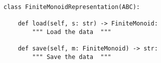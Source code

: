 \begin{verbatim}
class FiniteMonoidRepresentation(ABC):

    def load(self, s: str) -> FiniteMonoid:
        """ Load the data  """

    def save(self, m: FiniteMonoid) -> str:
        """ Save the data  """
\end{verbatim}